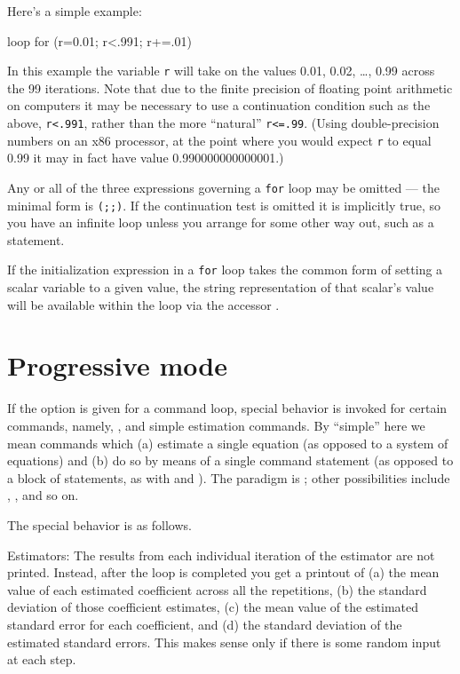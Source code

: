 Here's a simple example:
%
\begin{code}
loop for (r=0.01; r<.991; r+=.01)
\end{code}

In this example the variable \verb+r+ will take on the values 0.01,
0.02, \dots{}, 0.99 across the 99 iterations.  Note that due to the
finite precision of floating point arithmetic on computers it may be
necessary to use a continuation condition such as the above,
\verb+r<.991+, rather than the more ``natural'' \verb+r<=.99+.  (Using
double-precision numbers on an x86 processor, at the point where you
would expect \verb+r+ to equal 0.99 it may in fact have value
0.990000000000001.)

Any or all of the three expressions governing a \texttt{for} loop may
be omitted --- the minimal form is \texttt{(;;)}.  If the continuation
test is omitted it is implicitly true, so you have an infinite loop
unless you arrange for some other way out, such as a 
statement.

If the initialization expression in a \texttt{for} loop takes the
common form of setting a scalar variable to a given value, the string
representation of that scalar's value will be available within
the loop via the accessor .  


\section{Progressive mode}
\label{loop-progressive}

If the  option is given for a command loop,
special behavior is invoked for certain commands, namely, ,
 and simple estimation commands.  By ``simple'' here we
mean commands which (a) estimate a single equation (as opposed to a
system of equations) and (b) do so by means of a single command
statement (as opposed to a block of statements, as with  and
).  The paradigm is ; other possibilities include
, ,  and so on.

The special behavior is as follows.

Estimators: The results from each individual iteration of the
estimator are not printed.  Instead, after the loop is completed you
get a printout of (a) the mean value of each estimated coefficient
across all the repetitions, (b) the standard deviation of those
coefficient estimates, (c) the mean value of the estimated standard
error for each coefficient, and (d) the standard deviation of the
estimated standard errors.  This makes sense only if there is some
random input at each step.

